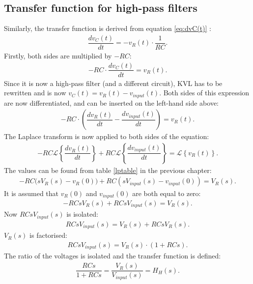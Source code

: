 \subsection{Transfer function for high-pass filters}
Similarly, the transfer function is derived from equation \eqref{eq:dvC(t)} :
\begin{align*}
\dfrac{dv_{C}(t)}{dt} = -v_{R}(t) \cdot \dfrac{1}{RC}.
\end{align*}
Firstly, both sides are multiplied by $-RC$:
\begin{align*}
-RC \cdot \dfrac{dv_{C}(t)}{dt} = v_{R}(t).
\end{align*}
Since it is now a high-pass filter (and a different circuit), KVL has to be rewritten and is now $v_{C}(t)=v_{R}(t)-v_{input}(t)$. Both sides of this expression are now differentiated, and can be inserted on the left-hand side above:
\begin{align*}
-RC \cdot \left(\dfrac{dv_{R}(t)}{dt} - \dfrac{dv_{input}(t)}{dt} \right) = v_{R}(t).
\end{align*}
The Laplace transform is now applied to both sides of the equation:
\begin{align*}
-RC \mathcal{L} \left\{\dfrac{dv_{R}(t)}{dt} \right\} + RC \mathcal{L} \left\{ \dfrac{dv_{input}(t)}{dt} \right\} = \mathcal{L} \left\{v_{R}(t) \right\}.
\end{align*}
The values can be found from table \ref{lptable} in the previous chapter:
\begin{align*}
-RC \big(sV_{R}(s)-v_{R}(0)\big) + RC \left(sV_{input}(s)-v_{input}(0)\right) = V_{R}(s).
\end{align*}
It is assumed that $v_{R}(0)$ and $v_{input}(0)$ are both equal to zero:
\begin{align*}
-RCsV_{R}(s) + RCsV_{input}(s) = V_{R}(s).
\end{align*}
Now $RCs V_{input}(s)$ is isolated:
\begin{align*}
RCsV_{input}(s) = V_{R}(s) + RCsV_{R}(s).
\end{align*}
$V_{R}(s)$ is factorised:
\begin{align*}
RCsV_{input}(s) = V_{R}(s) \cdot (1 + RCs).
\end{align*}
The ratio of the voltages is isolated and the transfer function is defined:
\begin{align} \label{hp:visolated}
\dfrac{RCs}{1 + RCs} = \dfrac{V_{R}(s)}{V_{input}(s)} = H_H(s).
\end{align}
